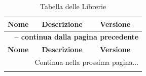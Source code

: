 \documentclass[a4paper,11pt]{article}
\begin{document}
\begin{longtable}{|p{3.5cm}|p{8.5cm}|p{3cm}|}
\caption{Tabella delle Librerie}\label{tab:librerie}\\
\hline
\rowcolor{primaryblue!40}
\textbf{Nome} & \textbf{Descrizione} & \textbf{Versione} \\
\hline
\endfirsthead

\multicolumn{3}{c}{{\bfseries \tablename\ \thetable{} -- continua dalla pagina precedente}}\\
\hline
\rowcolor{primaryblue!40}
\textbf{Nome} & \textbf{Descrizione} & \textbf{Versione} \\
\hline
\endhead

\hline
\multicolumn{3}{|r|}{{Continua nella prossima pagina...}}\\
\hline
\endfoot

\hline
\endlastfoot


\end{longtable}
\end{document}
